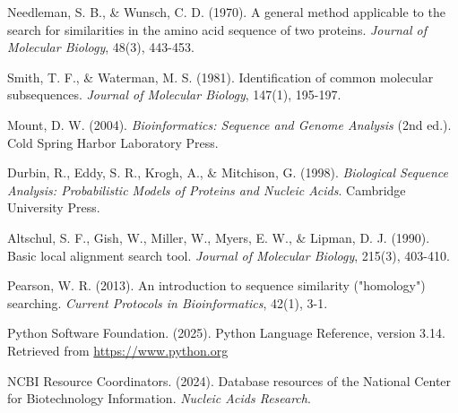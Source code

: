 \documentclass[12pt,a4paper]{article}
\begin{document}
\begin{enumerate}[label={[\arabic*]}, leftmargin=*]
    \item Needleman, S. B., \& Wunsch, C. D. (1970). A general method applicable to the search for similarities in the amino acid sequence of two proteins. \textit{Journal of Molecular Biology}, 48(3), 443-453.
    
    \item Smith, T. F., \& Waterman, M. S. (1981). Identification of common molecular subsequences. \textit{Journal of Molecular Biology}, 147(1), 195-197.
    
    \item Mount, D. W. (2004). \textit{Bioinformatics: Sequence and Genome Analysis} (2nd ed.). Cold Spring Harbor Laboratory Press.
    
    \item Durbin, R., Eddy, S. R., Krogh, A., \& Mitchison, G. (1998). \textit{Biological Sequence Analysis: Probabilistic Models of Proteins and Nucleic Acids}. Cambridge University Press.
    
    \item Altschul, S. F., Gish, W., Miller, W., Myers, E. W., \& Lipman, D. J. (1990). Basic local alignment search tool. \textit{Journal of Molecular Biology}, 215(3), 403-410.
    
    \item Pearson, W. R. (2013). An introduction to sequence similarity ("homology") searching. \textit{Current Protocols in Bioinformatics}, 42(1), 3-1.
    
    \item Python Software Foundation. (2025). Python Language Reference, version 3.14. Retrieved from \url{https://www.python.org}
    
    \item NCBI Resource Coordinators. (2024). Database resources of the National Center for Biotechnology Information. \textit{Nucleic Acids Research}.

\end{enumerate}
\end{document}

